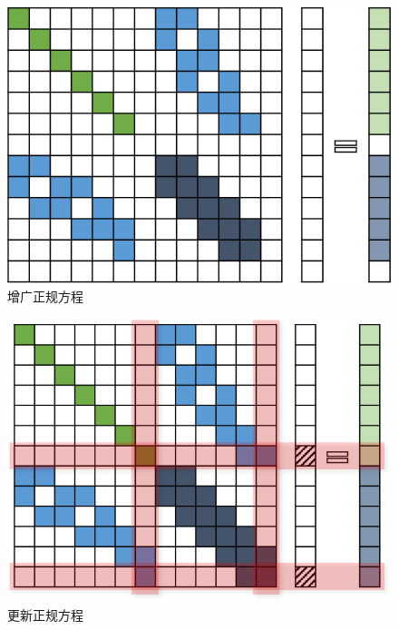 \begin{figure}[htb]
    \centering
    \includegraphics{figs/normal_eq_aug.png}
    \caption{增广正规方程}
\end{figure}

\begin{figure}[htb]
    \centering
    \includegraphics{figs/normal_eq_update.png}
    \caption{更新正规方程}
\end{figure}

